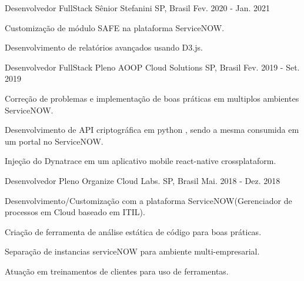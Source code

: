 \begin{cventries}
     \cventry
    {Desenvolvedor FullStack Sênior} %
    {Stefanini} %
    {SP, Brasil} %
    {Fev. 2020 - Jan. 2021} %
    {
    	\begin{cvitems} %
    		\item {Customização de módulo SAFE na plataforma ServiceNOW.}
    		\item {Desenvolvimento de relatórios avançados usando D3.js.}    		
    	\end{cvitems}
    }
    \cventry
    {Desenvolvedor FullStack Pleno} %
    {AOOP Cloud Solutions} %
    {SP, Brasil} %
    {Fev. 2019 - Set. 2019} %
    {
      \begin{cvitems} %
        \item {Correção de problemas e implementação de boas práticas em multiplos ambientes ServiceNOW.}
        \item {Desenvolvimento de API criptográfica em python , sendo a mesma consumida em um portal no ServiceNOW.}
        \item {Injeção do Dynatrace em um aplicativo mobile react-native crossplataform.}
      \end{cvitems}
    }   
	\cventry
	{Desenvolvedor Pleno} %
	{Organize Cloud Labs.} %
	{SP, Brasil} %
	{Mai. 2018 - Dez. 2018} %
	{
		\begin{cvitems} %
			\item {Desenvolvimento/Customização com a plataforma ServiceNOW(Gerenciador de processos em Cloud baseado em ITIL).}
			\item {Criação de ferramenta de análise estática de código para boas práticas.}
			\item {Separação de instancias serviceNOW para ambiente multi-empresarial.}
			\item {Atuação em treinamentos de clientes para uso de ferramentas.}
		\end{cvitems}
	}

\end{cventries}

